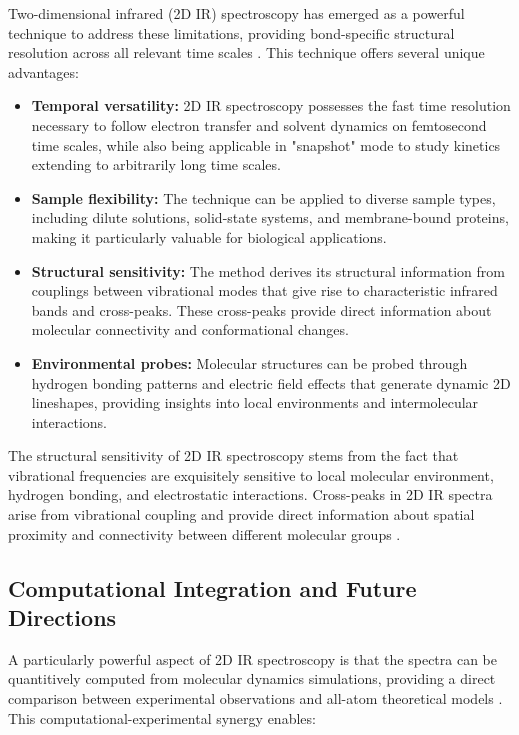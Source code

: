 	\noindent Two-dimensional infrared (2D IR) spectroscopy has emerged as a powerful technique to address these limitations, providing bond-specific structural resolution across all relevant time scales \cite{hammzanni2011conceptsmethods2d}. This technique offers several unique advantages:

	\begin{itemize}
		\item \textbf{Temporal versatility:} 2D IR spectroscopy possesses the fast time resolution necessary to follow electron transfer and solvent dynamics on femtosecond time scales, while also being applicable in "snapshot" mode to study kinetics extending to arbitrarily long time scales.

		\item \textbf{Sample flexibility:} The technique can be applied to diverse sample types, including dilute solutions, solid-state systems, and membrane-bound proteins, making it particularly valuable for biological applications.

		\item \textbf{Structural sensitivity:} The method derives its structural information from couplings between vibrational modes that give rise to characteristic infrared bands and cross-peaks. These cross-peaks provide direct information about molecular connectivity and conformational changes.

		\item \textbf{Environmental probes:} Molecular structures can be probed through hydrogen bonding patterns and electric field effects that generate dynamic 2D lineshapes, providing insights into local environments and intermolecular interactions.
	\end{itemize}

	\noindent The structural sensitivity of 2D IR spectroscopy stems from the fact that vibrational frequencies are exquisitely sensitive to local molecular environment, hydrogen bonding, and electrostatic interactions. Cross-peaks in 2D IR spectra arise from vibrational coupling and provide direct information about spatial proximity and connectivity between different molecular groups \cite{hammzanni2011conceptsmethods2d}.

	\subsection{Computational Integration and Future Directions}
	\label{subsec:computational_integration}

	\noindent A particularly powerful aspect of 2D IR spectroscopy is that the spectra can be quantitively computed from molecular dynamics simulations, providing a direct comparison between experimental observations and all-atom theoretical models \cite{hammzanni2011conceptsmethods2d}. This computational-experimental synergy enables:

